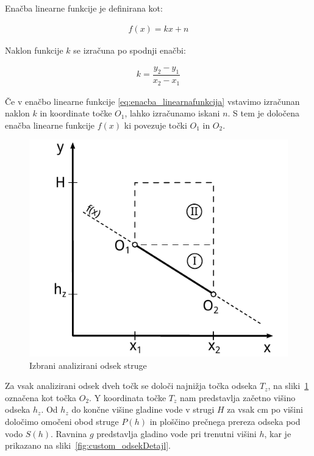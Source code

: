 Enačba linearne funkcije je definirana kot:
\begin{ceqn}
\begin{align}
f(x) = kx + n \label{eq:enacba_linearnafunkcija}
\end{align}
\end{ceqn}

Naklon funkcije $k$ se izračuna po spodnji enačbi:

\begin{ceqn}
\begin{align}
k = \dfrac{y_2 - y_1}{x_2 - x_1}
\end{align}
\end{ceqn}



Če v enačbo linearne funkcije \ref{eq:enacba_linearnafunkcija} vstavimo izračunan naklon $k$ in koordinate točke $O_1$, lahko izračunamo iskani $n$. S tem je določena enačba linearne funkcije $f(x)$ ki povezuje točki $O_1$ in $O_2$.

\begin{figure}[H]
	\begin{centering}
		\includegraphics{slike/customChannel/odsek.pdf}\caption{Izbrani analizirani odsek struge} \label{fig:odsekStruge}
	\end{centering}
\end{figure}








Za vsak analizirani odsek dveh točk se določi najnižja točka odseka $T_z$, na sliki~\ref{fig:odsekStruge} označena kot točka $O_2$. Y koordinata točke $T_z$ nam predstavlja začetno višino odseka $h_{z}$. Od $h_z$ do končne višine gladine vode v strugi $H$ za vsak cm po višini določimo omočeni obod struge $P(h)$ in ploščino prečnega prereza odseka pod vodo $S(h)$.   Ravnina $g$ predstavlja gladino vode pri trenutni višini $h$, kar je prikazano na sliki~\ref{fig:custom_odsekDetajl}.



